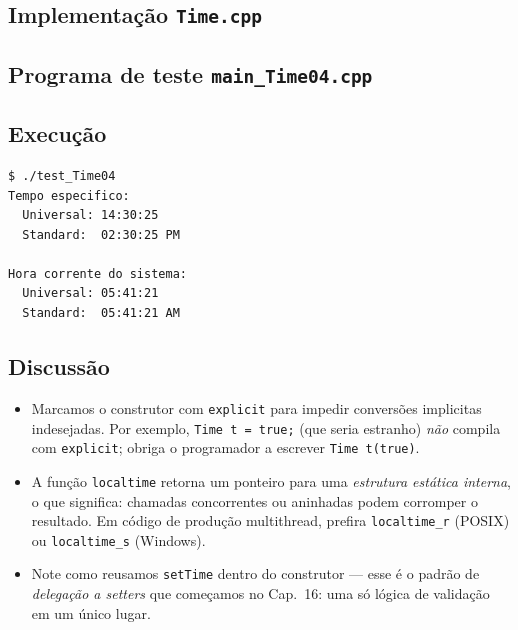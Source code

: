 \documentclass[11pt,a4paper]{article}
\begin{document}


\subsection*{Implementa\c{c}\~ao \texttt{Time.cpp}}



\subsection*{Programa de teste \texttt{main\_Time04.cpp}}



\subsection*{Execu\c{c}\~ao}

\begin{saidabox}
\begin{lstlisting}[style=terminal]
$ ./test_Time04
Tempo especifico:
  Universal: 14:30:25
  Standard:  02:30:25 PM

Hora corrente do sistema:
  Universal: 05:41:21
  Standard:  05:41:21 AM
\end{lstlisting}
\end{saidabox}

\subsection*{Discuss\~ao}

\begin{itemize}[leftmargin=*]
  \item Marcamos o construtor com \texttt{explicit} para impedir convers\~oes implicitas indesejadas. Por exemplo, \texttt{Time t = true;} (que seria estranho) \emph{n\~ao} compila com \texttt{explicit}; obriga o programador a escrever \texttt{Time t(true)}.
  \item A fun\c{c}\~ao \texttt{localtime} retorna um ponteiro para uma \emph{estrutura est\'atica interna}, o que significa: chamadas concorrentes ou aninhadas podem corromper o resultado. Em c\'odigo de produ\c{c}\~ao multithread, prefira \texttt{localtime\_r} (POSIX) ou \texttt{localtime\_s} (Windows).
  \item Note como reusamos \texttt{setTime} dentro do construtor --- esse \'e o padr\~ao de \emph{delega\c{c}\~ao a setters} que come\c{c}amos no Cap.~16: uma s\'o l\'ogica de valida\c{c}\~ao em um \'unico lugar.
\end{itemize}
\end{document}
